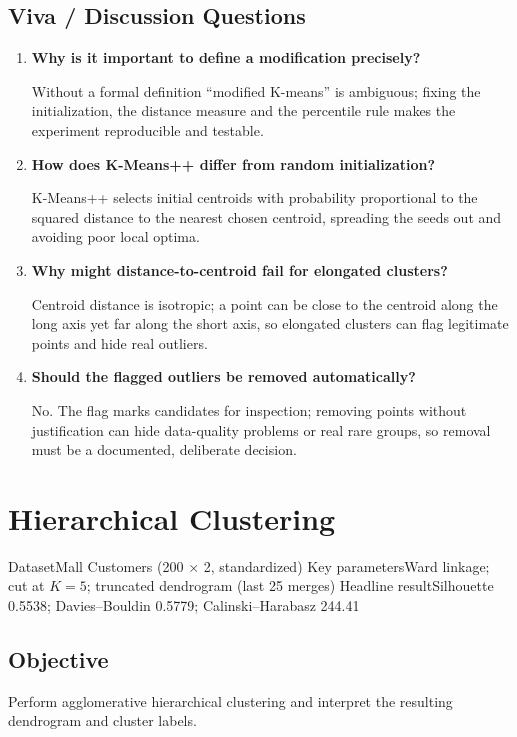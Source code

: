 \section{Viva / Discussion Questions}
\begin{enumerate}
  \item \textbf{Why is it important to define a modification precisely?}\par\nobreak Without a formal definition
  ``modified K-means'' is ambiguous; fixing the initialization, the distance measure and the
  percentile rule makes the experiment reproducible and testable.
  \item \textbf{How does K-Means++ differ from random initialization?}\par\nobreak K-Means++ selects initial
  centroids with probability proportional to the squared distance to the nearest chosen
  centroid, spreading the seeds out and avoiding poor local optima.
  \item \textbf{Why might distance-to-centroid fail for elongated clusters?}\par\nobreak Centroid distance is
  isotropic; a point can be close to the centroid along the long axis yet far along the short
  axis, so elongated clusters can flag legitimate points and hide real outliers.
\item \textbf{Should the flagged outliers be removed automatically?}\par\nobreak No. The flag marks candidates for inspection; removing points without justification can hide data-quality problems or real rare groups, so removal must be a documented, deliberate decision.
\end{enumerate}


\chapter{Hierarchical Clustering}\label{exp:03}


\quickfacts
  {Dataset}{Mall Customers (200 $\times$ 2, standardized)}
  {Key parameters}{Ward linkage; cut at $K = 5$; truncated dendrogram (last 25 merges)}
  {Headline result}{Silhouette 0.5538; Davies--Bouldin 0.5779; Calinski--Harabasz 244.41}

\section{Objective}
Perform agglomerative hierarchical clustering and interpret the resulting dendrogram and
cluster labels.

